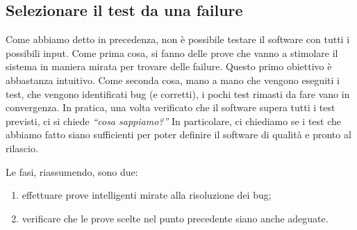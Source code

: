 \subsection{Selezionare il test da una failure}

Come abbiamo detto in precedenza, non è possibile testare il software con tutti i possibili input. Come prima cosa, si fanno delle prove che vanno a stimolare il sistema in maniera mirata per trovare delle failure. Questo primo obiettivo è abbastanza intuitivo. Come seconda cosa, mano a mano che vengono eseguiti i test, che vengono identificati bug (e corretti), i pochi test rimasti da fare vano in convergenza. In pratica, una volta verificato che il software supera tutti i test previsti, ci si chiede \textit{``cosa sappiamo?''} In particolare, ci chiediamo se i test che abbiamo fatto siano sufficienti per poter definire il software di qualità e pronto al rilascio.

Le fasi, riassumendo, sono due: \begin{enumerate}
    \item effettuare prove intelligenti mirate alla risoluzione dei bug;
    \item verificare che le prove scelte nel punto precedente siano anche adeguate.
\end{enumerate}

